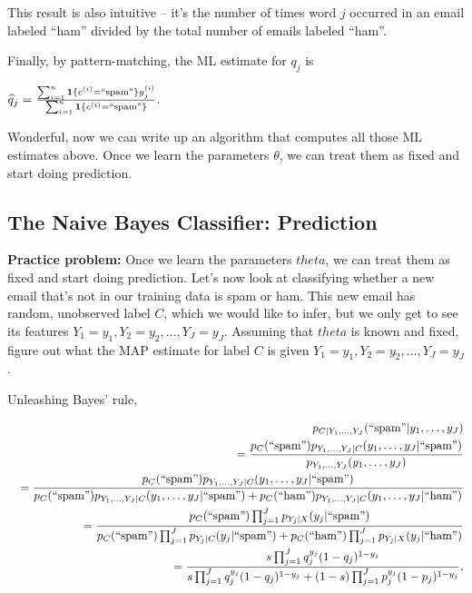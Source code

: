 This result is also intuitive -- it's the number of times word $j$ occurred in an email labeled ``ham'' divided by the total number of emails labeled ``ham''.

Finally, by pattern-matching, the ML estimate for $q_j$ is

{\centering$\widehat{q}_{j}=\frac{\sum _{i=1}^{n}\mathbf{1}\{ c^{(i)}=``\text {spam}"\} y_{j}^{(i)}}{\sum _{i=1}^{n}\mathbf{1}\{ c^{(i)}=``\text {spam}"\} }.$ \par}
 
Wonderful, now we can write up an algorithm that computes all those ML estimates above. Once we learn the parameters $\theta$, we can treat them as fixed and start doing prediction.


\subsection{The Naive Bayes Classifier: Prediction}

\textbf{Practice problem:} Once we learn the parameters $theta$, we can treat them as fixed and start doing prediction. Let's now look at classifying whether a new email that's not in our training data is spam or ham. This new email has random, unobserved label $C$, which we would like to infer, but we only get to see its features $Y_{1} = y_1,Y_{2} = y_2,\dots ,Y_{J} = y_ J$. Assuming that $theta$ is known and fixed, figure out what the MAP estimate for label $C$ is given $Y_{1} = y_1,Y_{2} = y_2,\dots ,Y_{J} = y_ J$.

Unleashing Bayes' rule,

\begin{eqnarray*}
 &&p_{C|Y_{1},\dots,Y_{J}}(``\text{spam}"|y_{1},\dots,y_{J})\\
 &&=\frac{p_{C}(``\text{spam}")p_{Y_{1},\dots,Y_{J}|C}(y_{1},\dots,y_{J}|``\text{spam}")}{p_{Y_{1},\dots,Y_{J}}(y_{1},\dots,y_{J})}\\
 &&=\frac{p_{C}(``\text{spam}")p_{Y_{1},\dots,Y_{J}|C}(y_{1},\dots,y_{J}|``\text{spam}")}{p_{C}(``\text{spam}")p_{Y_{1},\dots,Y_{J}|C}(y_{1},\dots,y_{J}|``\text{spam}")+p_{C}(``\text{ham}")p_{Y_{1},\dots,Y_{J}|C}(y_{1},\dots,y_{J}|``\text{ham}")} \\
 &&=\frac{p_{C}(``\text{spam}")\prod_{j=1}^{J}p_{Y_{j}|X}(y_{j}|``\text{spam}")}{p_{C}(``\text{spam}")\prod_{j=1}^{J}p_{Y_{j}|C}(y_{j}|``\text{spam}")+p_{C}(``\text{ham}")\prod_{j=1}^{J}p_{Y_{j}|X}(y_{j}|``\text{ham}")}\\
 &&=\frac{s\prod_{j=1}^{J}q_{j}^{y_{j}}(1-q_{j})^{1-y_{j}}}{s\prod_{j=1}^{J}q_{j}^{y_{j}}(1-q_{j})^{1-y_{j}}+(1-s)\prod_{j=1}^{J}p_{j}^{y_{j}}(1-p_{j})^{1-y_{j}}},
\end{eqnarray*}

